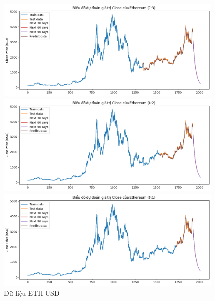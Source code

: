 \documentclass[conference]{IEEEtran}
\begin{document}
	\begin{figure}[H]
		\centering
		\begin{minipage}{0.15\textwidth}
			\centering
			\includegraphics[width=1\textwidth]{Figure/LN_ETH_73.png}
		\end{minipage}
		\hfill
		\begin{minipage}{0.15\textwidth}
			\centering
			\includegraphics[width=1\textwidth]{Figure/LN_ETH_82.png}
		\end{minipage}
		\hfill
		\begin{minipage}{0.15\textwidth}
			\centering
			\includegraphics[width=1\textwidth]{Figure/LN_ETH_91.png}
		\end{minipage}
		\caption{Dữ liệu ETH-USD}
		\label{fig:1}
	\end{figure}
 
\end{document}
